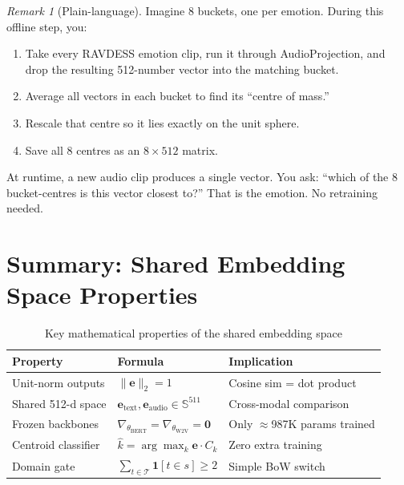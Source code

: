 \documentclass[12pt,a4paper]{article}
\theoremstyle{definition}
\theoremstyle{remark}
\newtheorem{remark}[theorem]{Remark}
\begin{document}
\begin{remark}[Plain-language]
Imagine 8 buckets, one per emotion.
During this offline step, you:
\begin{enumerate}
  \item Take every RAVDESS emotion clip, run it through AudioProjection,
        and drop the resulting 512-number vector into the matching bucket.
  \item Average all vectors in each bucket to find its ``centre of mass.''
  \item Rescale that centre so it lies exactly on the unit sphere.
  \item Save all 8 centres as an $8 \times 512$ matrix.
\end{enumerate}
At runtime, a new audio clip produces a single vector.
You ask: ``which of the 8 bucket-centres is this vector closest to?''
That is the emotion. No retraining needed.
\end{remark}

\section{Summary: Shared Embedding Space Properties}

\begin{table}[H]
\centering
\caption{Key mathematical properties of the shared embedding space}
\begin{tabularx}{\textwidth}{lXX}
\toprule
Property & Formula & Implication \\
\midrule
Unit-norm outputs & $\|\mathbf{e}\|_2 = 1$ & Cosine sim = dot product \\
Shared 512-d space & $\mathbf{e}_{\text{text}}, \mathbf{e}_{\text{audio}} \in \mathbb{S}^{511}$ & Cross-modal comparison \\
Frozen backbones & $\nabla_{\theta_{\text{BERT}}} = \nabla_{\theta_{\text{W2V}}} = \mathbf{0}$ & Only $\approx$987K params trained \\
Centroid classifier & $\hat{k} = \arg\max_k \mathbf{e} \cdot C_k$ & Zero extra training \\
Domain gate & $\sum_{t \in \mathcal{T}} \mathbf{1}[t \in s] \geq 2$ & Simple BoW switch \\
\bottomrule
\end{tabularx}
\end{table}
\end{document}
